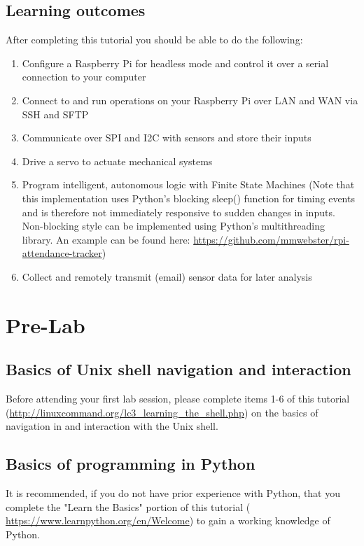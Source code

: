 \documentclass{article}
\begin{document}
  \subsection{Learning outcomes}
  After completing this tutorial you should be able to do the following:
  \begin{enumerate}
      \item Configure a Raspberry Pi for headless mode and control it over a serial connection to your computer
      \item Connect to and run operations on your Raspberry Pi over LAN and WAN via SSH and SFTP
      \item Communicate over SPI and I2C with sensors and store their inputs
      \item Drive a servo to actuate mechanical systems
      \item Program intelligent, autonomous logic with Finite State Machines (Note that this implementation uses Python's blocking sleep() function for timing events and is therefore not immediately responsive to sudden changes in inputs. Non-blocking style can be implemented using Python's multithreading library. An example can be found here: \url{https://github.com/mmwebster/rpi-attendance-tracker})
      \item Collect and remotely transmit (email) sensor data for later analysis
  \end{enumerate}

\section{Pre-Lab}
\subsection{Basics of Unix shell navigation and interaction}
Before attending your first lab session, please complete items 1-6 of this tutorial \newline (\url{http://linuxcommand.org/lc3\_learning\_the\_shell.php}) on the basics of navigation in and interaction with the Unix shell.

\subsection{Basics of programming in Python}
It is recommended, if you do not have prior experience with Python, that you complete the "Learn the Basics" portion of this tutorial (
\url{https://www.learnpython.org/en/Welcome}) to gain a working knowledge of Python.
\end{document}
